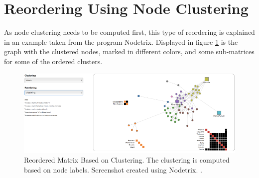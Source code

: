\section{Reordering Using Node Clustering}
As node clustering needs to be computed first, this type of reordering is explained in an example taken from the program Nodetrix. Displayed in figure \ref{fig:reordering_nodetrix_cluster} is the graph with the clustered nodes, marked in different colors, and some sub-matrices for some of the ordered clusters.

\begin{figure}[H]
  \centering
  \includegraphics[scale=0.9]{images/Reordering_NodeTrix_cluster.png}
  \caption{Reordered Matrix Based on Clustering. The clustering is computed based on node labels. Screenshot created using Nodetrix. \citep[1302-1309]{henry-nodetrix-2007}. \label{fig:reordering_nodetrix_cluster}}
\end{figure}
